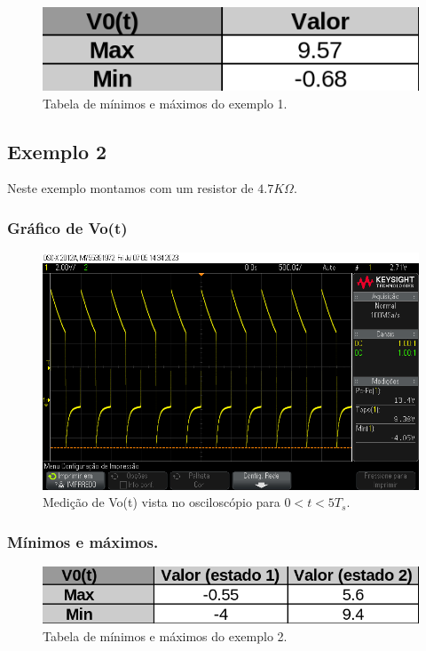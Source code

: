 \begin{figure}[H]
    \label{fig:minmax_ex1}
    \centering
    \includegraphics[width=0.5\columnwidth]{images/minmax_ex1.png}
    \caption{Tabela de mínimos e máximos do exemplo 1.}
\end{figure}

\newpage

\subsection{Exemplo 2}

Neste exemplo montamos com um resistor  de $4.7K \Omega$.

\subsubsection{Gráfico de Vo(t)}

\begin{figure}[h]
    \label{fig:ex2}
    \centering
    \includegraphics[width=0.7\columnwidth]{images/exemplo2.png}
    \caption{Medição de Vo(t) vista no osciloscópio para $0 < t < 5 T_s$.}
\end{figure}

\subsubsection{Mínimos e máximos.}

\begin{figure}[h]
    \label{fig:minmax_ex2}
    \centering
    \includegraphics[width=0.5\columnwidth]{images/minmax_ex2.png}
    \caption{Tabela de mínimos e máximos do exemplo 2.}
\end{figure}


